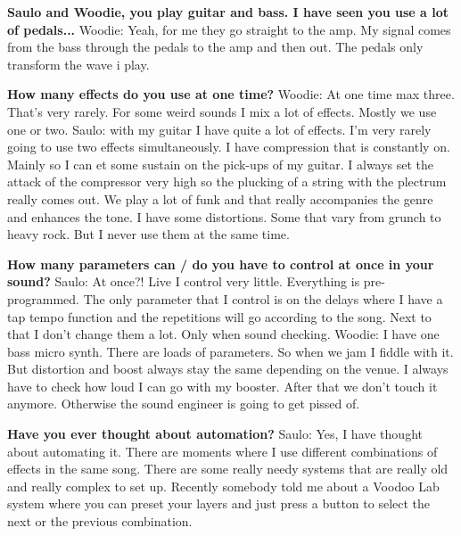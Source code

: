 \textbf{Saulo and Woodie, you play guitar and bass. I have seen you use a lot of pedals...}
\newline Woodie: Yeah, for me they go straight to the amp. My signal comes from the bass through the pedals to the amp and then out. The pedals only transform the wave i play.

\textbf{How many effects do you use at one time?}
\newline Woodie: At one time max three. That's very rarely. For some weird sounds I mix a lot of effects. Mostly we use one or two.
\newline Saulo: with my guitar I have quite a lot of effects. I'm very rarely going to use two effects simultaneously. I have compression that is constantly on. Mainly so I can et some sustain on the pick-ups of my guitar.
I always set the attack of the compressor very high so the plucking of a string with the plectrum really comes out. We play a lot of funk and that really accompanies the genre and enhances the tone.
I have some distortions. Some that vary from grunch to heavy rock. But I never use them at the same time.

\textbf{How many parameters can / do you have to control at once in your sound?}
\newline Saulo: At once?! Live I control very little. Everything is pre-programmed. The only parameter that I control is on the delays where I have a tap tempo function and the repetitions will go according to the song.
Next to that I don't change them a lot. Only when sound checking.
\newline Woodie: I have one bass micro synth. There are loads of parameters. So when we jam I fiddle with it. But distortion and boost always stay the same depending on the venue.
I always have to check how loud I can go with my booster. After that we don't touch it anymore. Otherwise the sound engineer is going to get pissed of.

\textbf{Have you ever thought about automation?}
\newline Saulo: Yes, I have thought about automating it. There are moments where I use different combinations of effects in the same song. There are some really needy systems that are really old and really complex to set up.
Recently somebody told me about a Voodoo Lab system where you can preset your layers and just press a button to select the next or the previous combination.

